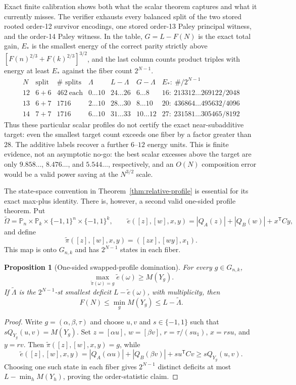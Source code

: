 \documentclass[11pt]{article}
\newtheorem{proposition}[theorem]{Proposition}
\newcommand{\eps}{\{-1,1\}}
\begin{document}
Exact finite calibration shows both what the scalar theorem captures and what
it currently misses.  The verifier exhausts every balanced split of the two
stored rooted order-12 survivor encodings, one stored order-13 Paley
principal witness, and the order-14 Paley witness.  In the table,
$G=L-F(N)$ is the exact total gain, $E_*$ is the smallest energy of the
correct parity strictly above
$[F(n)^{2/3}+F(k)^{2/3}]^{3/2}$, and the last column counts product triples
with energy at least $E_*$ against the fiber count $2^{N-1}$.
\[
\begin{array}{c|c|c|c|c|c|c}
N&\text{split}&\#\text{ splits}&\Lambda&L-\Lambda&G-\Lambda&E_*:\ \#\!/2^{N-1}\\ \hline
12&6+6&462\ \text{each}&0\ldots10&24\ldots26&6\ldots8&16:\ 213312\ldots269122/2048\\
13&6+7&1716&2\ldots10&28\ldots30&8\ldots10&20:\ 436864\ldots495632/4096\\
14&7+7&1716&6\ldots10&31\ldots33&10\ldots12&27:\ 231581\ldots305465/8192
\end{array}
\]
Thus these particular scalar profiles do not certify the exact
near-subadditive target: even the smallest target count exceeds one fiber by
a factor greater than $28$.  The additive labels recover a further
$6$--$12$ energy units.  This is finite evidence, not an asymptotic no-go:
the best scalar excesses above the target are only
$9.858\ldots$, $8.476\ldots$, and $5.544\ldots$, respectively, and an
$O(N)$ composition error would be a valid power saving at the
$N^{3/2}$ scale.

The state-space convention in Theorem~\ref{thm:relative-profile} is essential
for its exact max-plus identity.  There is, however, a second valid one-sided
profile theorem.  Put
\[
 \widetilde\Omega=\mathbb P_n\times\mathbb P_k
 \times\eps^n\times\eps^k,
 \qquad
 \widetilde e([z],[w],x,y)=|Q_A(z)|+|Q_B(w)|+x^{\mathsf T}Cy,
\]
and define
\[
 \widetilde\pi([z],[w],x,y)=([zx],[wy],x_1).
\]
This map is onto $G_{n,k}$ and has $2^{N-1}$ states in each fiber.

\begin{proposition}[One-sided swapped-profile domination]
\label{prop:swapped-profile}
For every $g\in G_{n,k}$,
\[
 \max_{\widetilde\pi(\omega)=g}\widetilde e(\omega)\ge M(Y_g).
\]
If $\widetilde\Lambda$ is the $2^{N-1}$-st smallest deficit
$L-\widetilde e(\omega)$, with multiplicity, then
\[
 F(N)\le\min_gM(Y_g)\le L-\widetilde\Lambda.
\]
\end{proposition}

\begin{proof}
Write $g=(\alpha,\beta,\tau)$ and choose $u,v$ and $s\in\eps$ such that
$sQ_{Y_g}(u,v)=M(Y_g)$.  Set $z=[\alpha u]$, $w=[\beta v]$,
$r=\tau/(su_1)$, $x=rsu$, and $y=rv$.  Then
$\widetilde\pi([z],[w],x,y)=g$, while
\[
 \widetilde e([z],[w],x,y)
 =|Q_A(\alpha u)|+|Q_B(\beta v)|+s u^{\mathsf T}Cv
 \ge sQ_{Y_g}(u,v).
\]
Choosing one such state in each fiber gives $2^{N-1}$ distinct deficits at
most $L-\min_hM(Y_h)$, proving the order-statistic claim.
\end{proof}
\end{document}
